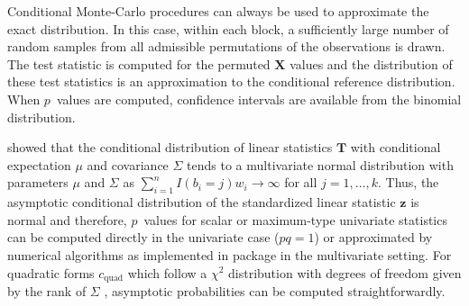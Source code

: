 \documentclass[article]{jss}
\newcommand{\z}{\mathbf{z}}
\newcommand{\X}{\mathbf{X}}
\newcommand{\T}{\mathbf{T}}
\begin{document}
Conditional Monte-Carlo procedures can always be used to approximate the exact
distribution. In this case, within each block, a sufficiently large number of
random samples from all admissible permutations of the observations is drawn. The 
test statistic is computed for the permuted $\X$ values and the 
distribution of these test statistics is an approximation to the 
conditional reference distribution. When $p$~values are computed,
confidence intervals are available from the binomial distribution.

\citet[Theorem 2.3]{StrasserWeber1999} showed that the   
conditional distribution of linear statistics $\T$ with conditional    
expectation $\mu$ and covariance $\Sigma$ tends to a multivariate normal
distribution with parameters $\mu$ and $\Sigma$ as $\sum_{i = 1}^n I(b_i = j)w_i \rightarrow \infty$ for all $j = 1, \dots, k$. 
Thus, the asymptotic conditional distribution of the standardized linear statistic $\z$ 
is normal and therefore, $p$~values for scalar or maximum-type univariate statistics
can be computed directly in the univariate case ($pq = 1$) 
or approximated by numerical algorithms
\citep{numerical-:1992} as implemented
in package  \citep{PKG:mvtnorm}
in the multivariate setting. For quadratic forms
$c_\text{quad}$ which follow a $\chi^2$ distribution with degrees of freedom 
given by the rank of $\Sigma$ \citep[see][Chapter 29]{johnsonkotz1970},
asymptotic probabilities can be computed straightforwardly.
\end{document}
